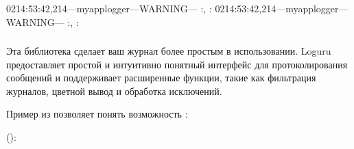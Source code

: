 \documentclass[letterpaper,10pt,russian]{sphinxmanual}
\begin{document}
\begin{sphinxVerbatim}[commandchars=\\\{\}]
\PYGZhy{}02\PYGZhy{}14:53:42,214—my\PYGZus{}app\PYGZus{}logger—WARNING—
:,
:
\PYGZhy{}02\PYGZhy{}14:53:42,214—my\PYGZus{}app\PYGZus{}logger—WARNING—
:,
:
\end{sphinxVerbatim}


\subsubsection{}
\label{\detokenize{educational_materials/logging/content:loguru}}
\sphinxAtStartPar
Эта библиотека сделает ваш журнал более простым в использовании. Loguru предоставляет простой и интуитивно понятный интерфейс для протоколирования сообщений и поддерживает расширенные функции, такие как фильтрация журналов, цветной вывод и обработка исключений.

\sphinxAtStartPar
Пример из  позволяет понять возможность :

\sphinxAtStartPar
():
\end{document}
